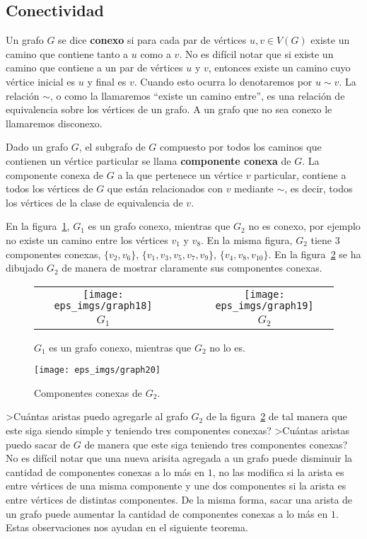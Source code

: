 \subsection{Conectividad}
\begin{definicion}
Un grafo $G$ se dice {\bf conexo} si para cada par de vértices $u,v\in V(G)$ existe un camino que contiene tanto a $u$ como a $v$.
No es difícil notar que si existe un camino que contiene a un par de vértices $u$ y $v$, entonces existe un camino cuyo vértice inicial es $u$ y final es $v$.
Cuando esto ocurra lo denotaremos por $u\sim v$.
La relación $\sim$, o como la llamaremos ``existe un camino entre'', es una relación de equivalencia sobre los vértices de un grafo.
A un grafo que no sea conexo le llamaremos disconexo.

Dado un grafo $G$, el subgrafo de $G$ compuesto por todos los caminos que contienen un vértice particular se llama {\bf componente conexa} de $G$.
La componente conexa de $G$ a la que pertenece un vértice $v$ particular, contiene a todos los vértices de $G$ que están relacionados con $v$ mediante $\sim$, es decir, todos los vértices de la clase de equivalencia de $v$.
\end{definicion}

\begin{ejemplo}
En la figura~\ref{fig:conex}, $G_1$ es un grafo conexo, mientras que $G_2$ no es conexo, por ejemplo no existe un camino entre los vértices $v_1$ y $v_8$.
En la misma figura, $G_2$ tiene $3$ componentes conexas, $\{v_2,v_6\}$, $\{v_1,v_3,v_5,v_7,v_9\}$, $\{v_4,v_8,v_{10}\}$.
En la figura~\ref{fig:conex-components} se ha dibujado $G_2$ de manera de mostrar claramente sus componentes conexas.
\begin{figure}[h!]
\centering
\begin{tabular}{cccc}
\texttt{[image: eps\_imgs/graph18]} & & & \texttt{[image: eps\_imgs/graph19]} \\
$G_1$ & & & $G_2$
\end{tabular}
\caption{$G_1$ es un grafo conexo, mientras que $G_2$ no lo es.}
\label{fig:conex}
\end{figure}
\begin{figure}[h!]
\centering
\texttt{[image: eps\_imgs/graph20]}
\caption{Componentes conexas de $G_2$.}
\label{fig:conex-components}
\end{figure}
\end{ejemplo}

>Cuántas aristas puedo agregarle al grafo $G_2$ de la figura~\ref{fig:conex-components} de tal manera que este siga siendo simple y teniendo tres componentes conexas?
>Cuántas aristas puedo sacar de $G$ de manera que este siga teniendo tres componentes conexas?
No es difícil notar que una nueva arisita agregada a un grafo puede disminuir la cantidad de componentes conexas a lo más en $1$, no las modifica si la arista es entre vértices de una misma componente y une dos componentes si la arista es entre vértices de distintas componentes.
De la misma forma, sacar una arista de un grafo puede aumentar la cantidad de componentes conexas a lo más en $1$.
Estas observaciones nos ayudan en el siguiente teorema.

